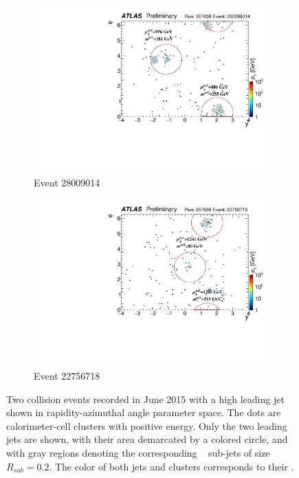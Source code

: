 \begin{figure}[htbp!]
  \centering
  \captionsetup{justification=centering}
  \hspace{-3cm}
    \begin{subfigure}[b]{0.35\textwidth}
        \includegraphics[width=\textwidth,angle=-90]{figures/object/Jet_evt_a.pdf}
        \caption{Event 28009014}
        \label{fig:obj_jet_evt_a}
    \end{subfigure}
    \quad \quad \quad \quad
    \begin{subfigure}[b]{0.35\textwidth}
        \includegraphics[width=\textwidth,angle=-90]{figures/object/Jet_evt_b.pdf}
        \caption{Event 22756718}
        \label{fig:obj_jet_evt_b}
    \end{subfigure}
   \caption{
   Two collision events recorded in June 2015 with a high leading jet \pt shown in rapidity-azimuthal angle parameter space. 
   The dots are calorimeter-cell clusters with positive energy. 
   Only the two leading jets are shown, with their area demarcated by a colored circle, and with gray regions denoting the corresponding \kt~ sub-jets of size $R_{sub}=0.2$. 
   The color of both jets and clusters corresponds to their \pt.}
  \label{fig:obj_jet_evt}
\end{figure}

